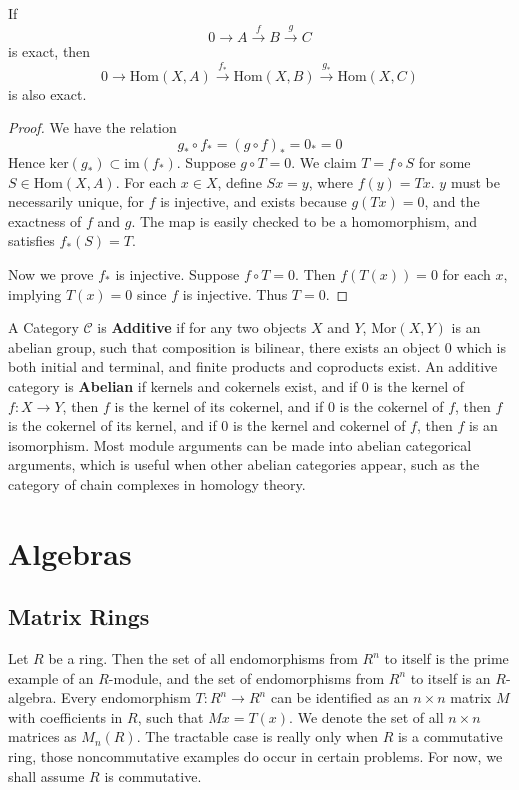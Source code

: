 \begin{theorem}
    If
    \[ 0 \xrightarrow{} A \xrightarrow{f} B \xrightarrow{g} C \]
    is exact, then
    \[ 0 \xrightarrow{} \text{Hom}(X,A) \xrightarrow{f_*} \text{Hom}(X,B) \xrightarrow{g_*} \text{Hom}(X,C) \]
    is also exact.
\end{theorem}
\begin{proof}
    We have the relation
    \[ g_* \circ f_* = (g \circ f)_* = 0_* = 0 \]
    Hence $\text{ker}(g_*) \subset \text{im}(f_*)$. Suppose $g \circ T = 0$. We claim $T = f \circ S$ for some $S \in \text{Hom}(X,A)$. For each $x \in X$, define $Sx = y$, where $f(y) = Tx$. $y$ must be necessarily unique, for $f$ is injective, and exists because $g(Tx) = 0$, and the exactness of $f$ and $g$. The map is easily checked to be a homomorphism, and satisfies $f_*(S) = T$.

    Now we prove $f_*$ is injective. Suppose $f \circ T = 0$. Then $f(T(x)) = 0$ for each $x$, implying $T(x) = 0$ since $f$ is injective. Thus $T = 0$.
\end{proof}

A Category $\mathcal{C}$ is {\bf Additive} if for any two objects $X$ and $Y$, $\text{Mor}(X,Y)$ is an abelian group, such that composition is bilinear, there exists an object $0$ which is both initial and terminal, and finite products and coproducts exist. An additive category is {\bf Abelian} if kernels and cokernels exist, and if $0$ is the kernel of $f: X \to Y$, then $f$ is the kernel of its cokernel, and if $0$ is the cokernel of $f$, then $f$ is the cokernel of its kernel, and if $0$ is the kernel and cokernel of $f$, then $f$ is an isomorphism. Most module arguments can be made into abelian categorical arguments, which is useful when other abelian categories appear, such as the category of chain complexes in homology theory.

\chapter{Algebras}

\section{Matrix Rings}

Let $R$ be a ring. Then the set of all endomorphisms from $R^n$ to itself is the prime example of an $R$-module, and the set of endomorphisms from $R^n$ to itself is an $R$-algebra. Every endomorphism $T:R^n \to R^n$ can be identified as an $n \times n$ matrix $M$ with coefficients in $R$, such that $Mx = T(x)$. We denote the set of all $n \times n$ matrices as $M_n(R)$. The tractable case is really only when $R$ is a commutative ring, those noncommutative examples do occur in certain problems. For now, we shall assume $R$ is commutative.

